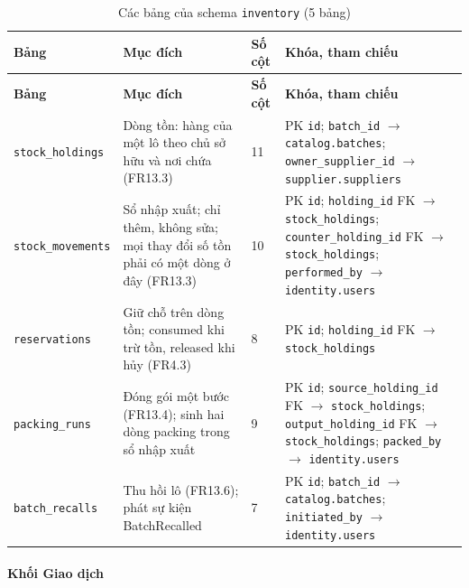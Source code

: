 \begingroup
\tblsetup\footnotesize\renewcommand{\arraystretch}{1.1}
\begin{longtable}{L{3.20cm} L{5.60cm} L{1.10cm} L{5.00cm}}
\caption{Các bảng của schema \texttt{inventory} (5 bảng)}
\label{tab:db-inventory} \\
\toprule
{}
\textbf{Bảng} & \textbf{Mục đích} & \textbf{Số cột} & \textbf{Khóa, tham chiếu} \\
\midrule
\endfirsthead
\toprule
{}
\textbf{Bảng} & \textbf{Mục đích} & \textbf{Số cột} & \textbf{Khóa, tham chiếu} \\
\midrule
\endhead
\bottomrule
\endfoot
\texttt{stock\_\allowbreak{}holdings} & Dòng tồn: hàng của một lô theo chủ sở hữu và nơi chứa (FR13.3) & 11 & PK \texttt{id}; \texttt{batch\_\allowbreak{}id} $\to$ \texttt{catalog.batches}; \texttt{owner\_\allowbreak{}supplier\_\allowbreak{}id} $\to$ \texttt{supplier.suppliers} \\
\texttt{stock\_\allowbreak{}movements} & Sổ nhập xuất; chỉ thêm, không sửa; mọi thay đổi số tồn phải có một dòng ở đây (FR13.3) & 10 & PK \texttt{id}; \texttt{holding\_\allowbreak{}id} FK $\to$ \texttt{stock\_\allowbreak{}holdings}; \texttt{counter\_\allowbreak{}holding\_\allowbreak{}id} FK $\to$ \texttt{stock\_\allowbreak{}holdings}; \texttt{performed\_\allowbreak{}by} $\to$ \texttt{identity.users} \\
\texttt{reservations} & Giữ chỗ trên dòng tồn; consumed khi trừ tồn, released khi hủy (FR4.3) & 8 & PK \texttt{id}; \texttt{holding\_\allowbreak{}id} FK $\to$ \texttt{stock\_\allowbreak{}holdings} \\
\texttt{packing\_\allowbreak{}runs} & Đóng gói một bước (FR13.4); sinh hai dòng packing trong sổ nhập xuất & 9 & PK \texttt{id}; \texttt{source\_\allowbreak{}holding\_\allowbreak{}id} FK $\to$ \texttt{stock\_\allowbreak{}holdings}; \texttt{output\_\allowbreak{}holding\_\allowbreak{}id} FK $\to$ \texttt{stock\_\allowbreak{}holdings}; \texttt{packed\_\allowbreak{}by} $\to$ \texttt{identity.users} \\
\texttt{batch\_\allowbreak{}recalls} & Thu hồi lô (FR13.6); phát sự kiện BatchRecalled & 7 & PK \texttt{id}; \texttt{batch\_\allowbreak{}id} $\to$ \texttt{catalog.batches}; \texttt{initiated\_\allowbreak{}by} $\to$ \texttt{identity.users} \\
\end{longtable}
\endgroup

\paragraph*{Khối Giao dịch}

